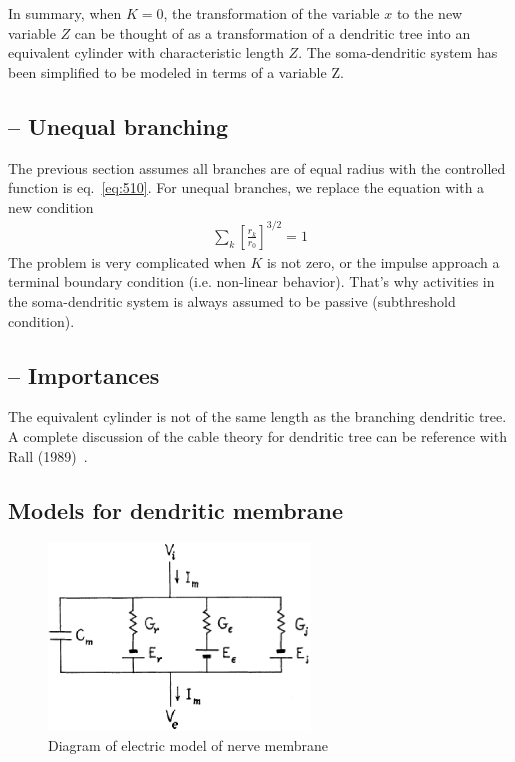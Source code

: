 In summary, when $K=0$, the transformation of the variable $x$ to the
new variable $Z$ can be thought of as a transformation of a dendritic
tree into an equivalent cylinder with characteristic length $Z$. The
soma-dendritic system has been simplified to be modeled in terms of a
variable Z.




\subsection{-- Unequal branching}
\label{sec:unequal-branching}

The previous section assumes all branches are of equal radius with the
controlled function is eq.~\eqref{eq:510}. For unequal branches, we
replace the equation with a new condition
\begin{eqnarray}
  \label{eq:516}
  \sum_k \left[ \frac{r_k}{r_0}\right]^{3/2} = 1
\end{eqnarray}
The problem is very complicated when $K$ is not zero, or the impulse
approach a terminal boundary condition (i.e. non-linear behavior). 
That's why activities in the soma-dendritic system is always assumed
to be passive (subthreshold condition).


\subsection{-- Importances}
\label{sec:importances}

The equivalent cylinder is not of the same length as the branching
dendritic tree. A complete discussion of the cable theory for
dendritic tree can be reference with Rall (1989)~\cite{rall1989ctdn}.

\subsection{Models for dendritic membrane}
\label{sec:models-membrane}

\begin{figure}[hbt]
  \centerline{\includegraphics[height=5cm,
    angle=0]{./images/membrane.eps}}
 \caption{Diagram of electric model of nerve membrane}
\label{fig:membrane}
\end{figure}

